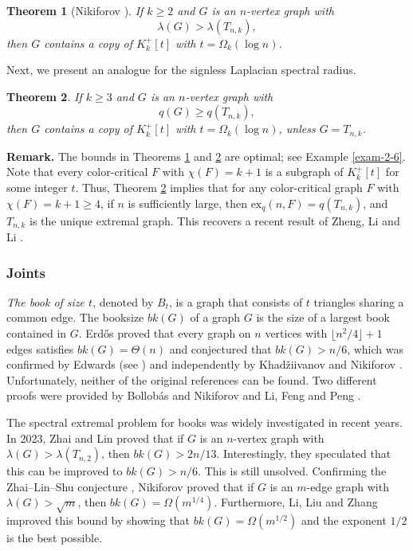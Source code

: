 \documentclass[11pt,a4paper]{article}
\theoremstyle{plain}
\newtheorem{theorem}{Theorem}[section]
\theoremstyle{definition}
\begin{document}
 \begin{theorem}[Nikiforov \cite{N2009}] 
 \label{thm-2-5}
If $k\geq 2$ and $G$ is an $n$-vertex graph with 
\[ \lambda (G)> \lambda ( T_{n,k}), \]
then $G$ contains a copy of 
$K_{k}^{+}[t]$ with $t=\Omega_k( \log n)$.
\end{theorem}


 

Next, we present an analogue for the signless Laplacian spectral radius. 

\begin{theorem}\label{thm-h3}
If $k\geq 3$ and $G$ is an $n$-vertex graph with 
\[ q(G)\ge q( T_{n,k}), \] 
then $G$ contains a copy of 
$K_{k}^{+}[t]$ with $t=\Omega_k(\log n)$, unless $G=T_{n,k}$.
\end{theorem}



\noindent 
{\bf Remark.} 
The bounds in Theorems \ref{thm-2-5} and \ref{thm-h3} are optimal; see Example \ref{exam-2-6}. 
 Note that every color-critical $F$ with $\chi (F)=k+1$ is a subgraph of $K_{k}^{+}[t]$ for some integer $t$.  
Thus, Theorem \ref{thm-h3} implies that for 
any color-critical graph $F$ with $\chi(F)=k+1\ge 4$, if $n$ is sufficiently large, then 
$\mathrm{ex}_q(n,F) = q (T_{n,k})$, and $T_{n,k}$ is the unique extremal graph. This recovers a recent result of Zheng, Li and Li \cite{ZLL2025}. 



\subsubsection{Joints}

{\it The book of size $t$}, denoted by $B_t$, is a graph that consists of $t$ triangles sharing a common edge. 
The booksize $bk(G)$ of a graph $G$ is the size of a largest book contained in $G$. 
Erd\H{o}s \cite{Erd1962a} proved that every graph on $n$ vertices with $\lfloor n^2/4\rfloor +1$ edges satisfies $bk(G) = \Theta(n)$ and conjectured that $bk(G)> n / 6$, which was confirmed by Edwards (see \cite[Lemma 4]{EFR1992}) 
and independently 
by Khad\v{z}iivanov and Nikiforov  \cite{KN1979}.   
Unfortunately, neither of the original references can be found.  
Two different proofs were provided by 
Bollob\'{a}s and Nikiforov \cite{BN2005} and Li, Feng and Peng \cite[Sec. 4.3]{LFP2024-triangular}.  


The spectral extremal problem for books was widely investigated in recent years. 
In 2023, Zhai and Lin \cite{ZL2022jgt} proved that if $G$ is an $n$-vertex graph with $\lambda (G)> \lambda (T_{n,2})$, then $bk(G)> 2n/13$. Interestingly, they \cite[Problem 1.2]{ZL2022jgt} speculated that this can be improved to $bk(G)> n/6$. This is still unsolved. 
Confirming the Zhai--Lin--Shu conjecture  \cite{ZLS2021}, Nikiforov \cite{Niki2021} proved that if $G$ is an $m$-edge graph with $\lambda (G) > \sqrt{m}$, then $bk(G) =\Omega(m^{1/4})$. 
Furthermore, Li, Liu and Zhang \cite{LLZ2024-book-4-cycle} improved this bound by showing that  $bk(G)=\Omega({m}^{1/2})$ and the exponent $1/2$ is the best possible. 
\end{document}

